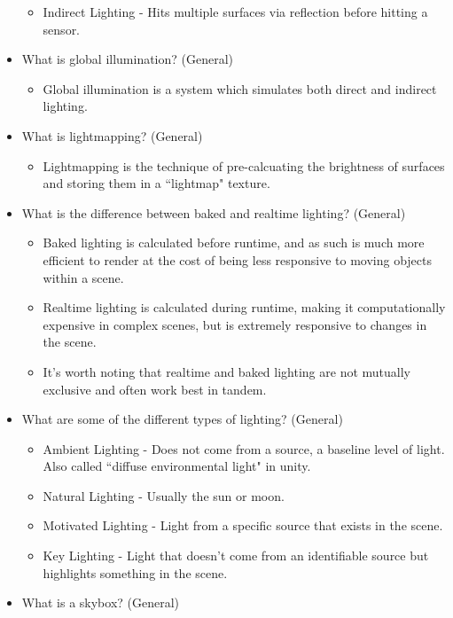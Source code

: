 \documentclass{article}
\begin{document}
\begin{itemize}
\begin{itemize}
        \item Indirect Lighting - Hits multiple surfaces via reflection before hitting a sensor.
    \end{itemize}
    \item What is global illumination? (General)
    \begin{itemize}
        \item Global illumination is a system which simulates both direct and indirect lighting.
    \end{itemize}
     \item What is lightmapping? (General)
    \begin{itemize}
        \item Lightmapping is the technique of pre-calcuating the brightness of surfaces and storing them in a ``lightmap" texture.
    \end{itemize}
     \item What is the difference between baked and realtime lighting? (General)
    \begin{itemize}
        \item Baked lighting is calculated before runtime, and as such is much more efficient to render at the cost of being less responsive to moving objects within a scene.
        \item Realtime lighting is calculated during runtime, making it computationally expensive in complex scenes, but is extremely responsive to changes in the scene.
        \item It's worth noting that realtime and baked lighting are not mutually exclusive and often work best in tandem.
    \end{itemize}
    \item What are some of the different types of lighting? (General)
    \begin{itemize}
        \item Ambient Lighting - Does not come from a source, a baseline level of light. Also called ``diffuse environmental light" in unity.
        \item Natural Lighting - Usually the sun or moon.
        \item Motivated Lighting - Light from a specific source that exists in the scene.
        \item Key Lighting - Light that doesn't come from an identifiable source but highlights something in the scene.
    \end{itemize}
    \item What is a skybox? (General)

\end{itemize}
\end{document}
